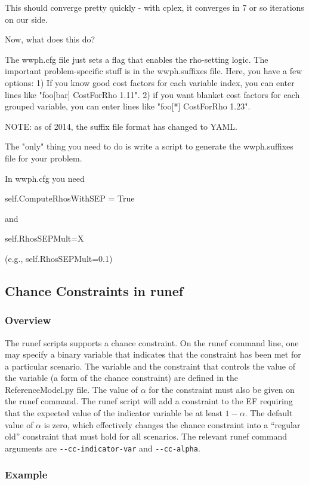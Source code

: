 This should converge pretty quickly - with cplex, it converges in 7 or so iterations on our side.

Now, what does this do?

The wwph.cfg file just sets a flag that enables the rho-setting logic. The important problem-specific stuff is in the wwph.suffixes file. Here, you have a few options:
1) If you know good cost factors for each variable index, you can enter lines like "foo[bar] CostForRho 1.11".
2) if you want blanket cost factors for each grouped variable, you can enter lines like "foo[*] CostForRho 1.23".

NOTE: as of 2014, the suffix file format has changed to YAML.

The "only" thing you need to do is write a script to generate the wwph.suffixes file for your problem.

In wwph.cfg you need

self.ComputeRhosWithSEP = True

and 

self.RhosSEPMult=X

(e.g., self.RhosSEPMult=0.1)

\subsection{Chance Constraints in runef}

\subsubsection{Overview}

The runef scripts supports a chance constraint. On the runef command line, one
may specify a binary variable that
indicates that the constraint has been met for a particular scenario. The variable and the
constraint that controls the value of the variable (a form of the chance constraint)
are defined in the ReferenceModel.py file. The value of $\alpha$ for the constraint
must also be given on the runef command. The runef script will add a constraint
to the EF requiring that the expected value of the indicator variable be at least
$1-\alpha$. The default value of $\alpha$ is zero, which effectively changes the chance
constraint into a ``regular old'' constraint that must hold for all scenarios. The 
relevant runef command arguments are \verb|--cc-indicator-var| and \verb|--cc-alpha|. 

\subsubsection{Example}

